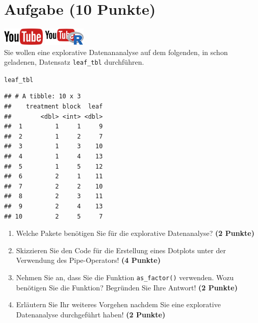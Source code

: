 \documentclass[a4paper, 10pt]{scrartcl}\usepackage[]{graphicx}\usepackage[]{xcolor}
\makeatletter
\newcommand{\hlstd}[1]{\textcolor[rgb]{0.345,0.345,0.345}{#1}}%
\newenvironment{kframe}{%
 \def\at@end@of@kframe{}%
 \ifinner\ifhmode%
  \def\at@end@of@kframe{\end{minipage}}%
  \begin{minipage}{\columnwidth}%
 \fi\fi%
 \def\FrameCommand##1{\hskip\@totalleftmargin \hskip-\fboxsep
 \colorbox{shadecolor}{##1}\hskip-\fboxsep
     \hskip-\linewidth \hskip-\@totalleftmargin \hskip\columnwidth}%
 \MakeFramed {\advance\hsize-\width
   \@totalleftmargin\z@ \linewidth\hsize
   \@setminipage}}%
 {\par\unskip\endMakeFramed%
 \at@end@of@kframe}
\newenvironment{knitrout}{}{} %
\makeatother
\begin{document}
 
\clearpage

\section{Aufgabe \hfill (10 Punkte)}

\hfill\href{https://youtu.be/WIgK_Oj_NW0}{\includegraphics[width =
  2cm]{img/youtube}}
\hspace{2Ex}
\href{https://youtu.be/JCdL7JrZo9o}{\includegraphics[width =
  2cm]{img/youtube_R}}\\[1Ex]


Sie wollen eine explorative Datenananalyse auf dem folgenden, in \Rlogo schon geladenen, Datensatz \texttt{leaf\_tbl} durchf{\"u}hren.



\begin{knitrout}
\color{fgcolor}\begin{kframe}
\begin{alltt}
\hlstd{leaf_tbl}
\end{alltt}
\begin{verbatim}
## # A tibble: 10 x 3
##    treatment block  leaf
##        <dbl> <int> <dbl>
##  1         1     1     9
##  2         1     2     7
##  3         1     3    10
##  4         1     4    13
##  5         1     5    12
##  6         2     1    11
##  7         2     2    10
##  8         2     3    11
##  9         2     4    13
## 10         2     5     7
\end{verbatim}
\end{kframe}
\end{knitrout}

\begin{enumerate}
\item Welche \Rlogo Pakete ben{\"o}tigen Sie f{\"u}r die explorative Datenanalyse?
  \textbf{(2 Punkte)} 
\item Skizzieren Sie den \Rlogo Code f{\"u}r die Erstellung eines
  Dotplots unter der Verwendung des Pipe-Operators! \textbf{(4 Punkte)}
\item Nehmen Sie an, dass Sie die Funktion \texttt{as\_factor()}
  verwenden. Wozu ben{\"o}tigen Sie die Funktion? Begr{\"u}nden Sie Ihre Antwort!
  \textbf{(2 Punkte)}
\item Erl{\"a}utern Sie Ihr weiteres Vorgehen nachdem Sie eine explorative
  Datenanalyse durchgef{\"u}hrt haben! \textbf{(2 Punkte)}
\end{enumerate}
\end{document}
